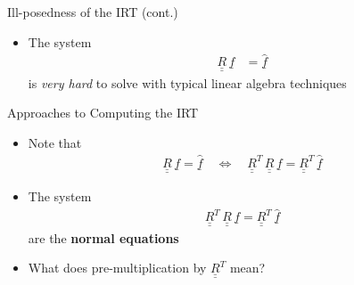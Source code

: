 \documentclass{beamer}
\newcommand{\bunderline}[1]{\underline{#1}}
\renewcommand{\vec}[1]{{\bunderline{#1}}}
\newcommand{\mat}[1]{{\bunderline{\bunderline{#1}}}}
\begin{document}
\begin{frame}{Ill-posedness of the IRT (cont.)}
	\begin{itemize}
		\item The system
		\begin{align*}
		    \mat{R} \, \vec{f} & = \widehat{\vec{f}}
		\end{align*}
		is \textit{very hard} to solve with typical linear algebra techniques
	\end{itemize}
\end{frame}


\begin{frame}{Approaches to Computing the IRT}
    \begin{itemize}
        \item Note that
        \begin{align*}
            \mat{R} \, \vec{f} = \widehat{\vec{f}} \quad \Longleftrightarrow \quad \mat{R}^{T} \, \mat{R} \, \vec{f} = \mat{R}^{T} \, \widehat{\vec{f}}
        \end{align*}
        \item The system 
        \begin{align*}
            \mat{R}^{T} \, \mat{R} \, \vec{f} = \mat{R}^{T} \, \widehat{\vec{f}}
        \end{align*}
        are the \textbf{normal equations}
        \item What does pre-multiplication by $\mat{R}^{T}$ mean?
    \end{itemize}
\end{frame}
\end{document}
